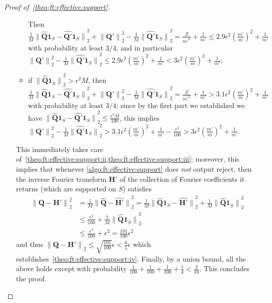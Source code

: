 \documentclass[11pt]{article}
\theoremstyle{definition}
\newcommand{\q}{\mathbf{Q}}
\newcommand{\h}{\mathbf{H}}
\newcommand{\eps}{\epsilon}
\newcommand{\norm}[1]{\lVert#1\rVert}
\newcommand{\normtwo}[1]{{\norm{#1}}_2}
\newcommand{\reject}{\textsf{reject}\xspace}
\newcommand{\fourier}[1]{\widehat{#1}}
\begin{document}
\begin{proof}[Proof of~\cref{theo:ft:effective:support}]
\begin{itemize}
\begin{itemize}
      Then $\frac{1}{M}\normtwo{\fourier{\q}\mathbf{1}_{S}-\fourier{\q'}\mathbf{1}_{S}}^2 + \normtwo{\q'}^2 - \frac{1}{M}\normtwo{\fourier{\q'}\mathbf{1}_{S}}^2 = \frac{Z}{m'^2}+\frac{1}{m'} \leq 2.9\eps^2\left(\frac{m'}{m}\right)^2+\frac{1}{m'}$ with probability at least $3/4$, and in particular 
      $\normtwo{\q'}^2 - \frac{1}{M}\normtwo{\fourier{\q'}\mathbf{1}_{S}}^2 \leq 2.9\eps^2\left(\frac{m'}{m}\right)^2+\frac{1}{m'} < 3\eps^2\left(\frac{m'}{m}\right)^2+\frac{1}{m'}$;
      \item if $\normtwo{\fourier{\q}\mathbf{1}_{\bar{S}}}^2 > \eps^2M$,
           then $\frac{1}{M}\normtwo{\fourier{\q}\mathbf{1}_{S}-\fourier{\q'}\mathbf{1}_{S}}^2 + \normtwo{\q'}^2 - \frac{1}{M}\normtwo{\fourier{\q'}\mathbf{1}_{S}}^2 =\frac{Z}{m'^2}+\frac{1}{m'} > 3.1\eps^2\left(\frac{m'}{m}\right)^2+\frac{1}{m'}$ with probability at least $3/4$; since by the first part we established we have $\normtwo{\fourier{\q}\mathbf{1}_{S}-\fourier{\q'}\mathbf{1}_{S}}^2\leq \frac{\eps^2M}{100}$, this implies $\normtwo{\q'}^2 - \frac{1}{M}\normtwo{\fourier{\q'}\mathbf{1}_{S}}^2 > 3.1\eps^2\left(\frac{m'}{m}\right)^2+\frac{1}{m'} - \frac{\eps^2}{100}>  3\eps^2\left(\frac{m'}{m}\right)^2+\frac{1}{m'}$.
    \end{itemize}
    
    This immediately takes care of~\cref{theo:ft:effective:support:ii,theo:ft:effective:support:iii}; moreover, this implies that whenever \cref{algo:ft:effective:support} does \emph{not} output \reject, then the inverse Fourier transform $\h'$ of the collection of Fourier coefficients it returns (which are supported on $S$) satisfies
    \begin{align*}
       \normtwo{\q-\h'}^2 &= \frac{1}{M}\normtwo{\fourier{\q}-\fourier{\h'}}^2 = \frac{1}{M}\normtwo{\fourier{\q}\mathbf{1}_{S}-\fourier{\h'}}^2 + \frac{1}{M}\normtwo{\fourier{\q}\mathbf{1}_{\bar{S}}}^2 \\
        &\leq \frac{\eps^2}{100} + \frac{1}{M}\normtwo{\fourier{\q}\mathbf{1}_{\bar{S}}}^2 \\
        &\leq \frac{\eps^2}{100} + \eps^2 = \frac{101}{100}\eps^2
    \end{align*}
    and thus
    $
        \normtwo{\q-\h'} \leq  \sqrt{\frac{101}{100}}\eps < \frac{6}{5}\eps
    $
    which establishes~\cref{theo:ft:effective:support:iv}. Finally, by a union bound, all the above holds except with probability $\frac{1}{100}+\frac{1}{100}+\frac{1}{100}+\frac{1}{4}<\frac{3}{10}$. This concludes the proof.

\end{itemize}

\end{proof}
\end{document}
